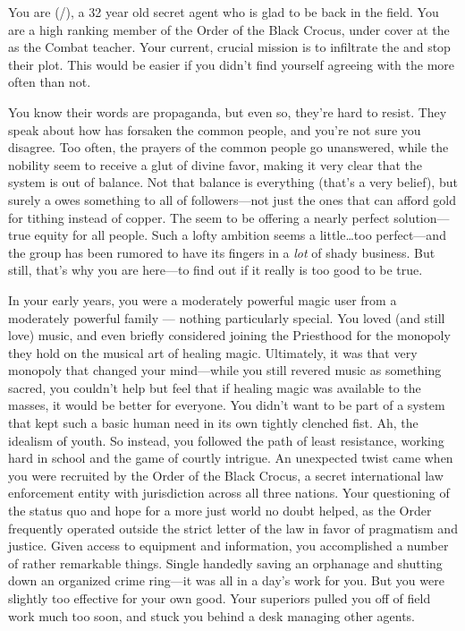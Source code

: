\documentclass[char]{GL2020}
\begin{document}
\name{\cInterpol{}}

You are \cInterpol{\full} (\cInterpol{\they}/\cInterpol{\them}), a 32 year old secret agent who is glad to be back in the field. You are a high ranking member of the Order of the Black Crocus, under cover at the \pSchool{} as the Combat teacher. Your current, crucial mission is to infiltrate the \pGoaties{} and stop their plot. This would be easier if you didn't find yourself agreeing with the \pGoaties{} more often than not.

You know their words are propaganda, but even so, they're hard to resist. They speak about how \cFarmGod{} has forsaken the common people, and you're not sure you disagree. Too often, the prayers of the common people go unanswered, while the nobility seem to receive a glut of divine favor, making it very clear that the system is out of balance. Not that balance is everything (that's a very \pShip{} belief), but surely a \cFarmGod{\God} owes something to all of \cFarmGod{\their} followers---not just the ones that can afford gold for tithing instead of copper. The \pGoaties{} seem to be offering a nearly perfect solution---true equity for all people. Such a lofty ambition seems a little\ldots{}too perfect---and the group has been rumored to have its fingers in a \emph{lot} of shady business. But still, that's why you are here---to find out if it really is too good to be true.

In your early years, you were a moderately powerful magic user from a moderately powerful family — nothing particularly special. You loved (and still love) music, and even briefly considered joining the Priesthood for the monopoly they hold on the musical art of healing magic. Ultimately, it was that very monopoly that changed your mind---while you still revered music as something sacred, you couldn't help but feel that if healing magic was available to the masses, it would be better for everyone. You didn't want to be part of a system that kept such a basic human need in its own tightly clenched fist. Ah, the idealism of youth. So instead, you followed the path of least resistance, working hard in school and the game of courtly intrigue. An unexpected twist came when you were recruited by the Order of the Black Crocus, a secret international law enforcement entity with jurisdiction across all three nations. Your questioning of the status quo and hope for a more just world no doubt helped, as the Order frequently operated outside the strict letter of the law in favor of pragmatism and justice. Given access to equipment and information, you accomplished a number of rather remarkable things. Single handedly saving an orphanage and shutting down an organized crime ring---it was all in a day's work for you. But you were slightly too effective for your own good. Your superiors pulled you off of field work much too soon, and stuck you behind a desk managing other agents.
\end{document}

